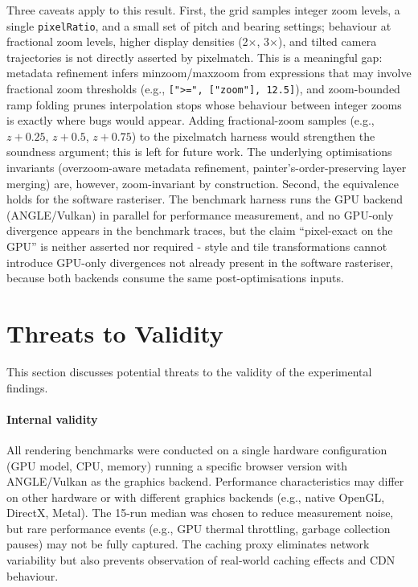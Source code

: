 Three caveats apply to this result.
First, the grid samples integer zoom levels, a single \texttt{pixelRatio}, and a small set of pitch and bearing settings; behaviour at fractional zoom levels, higher display densities (2$\times$, 3$\times$), and tilted camera trajectories is not directly asserted by pixelmatch.
This is a meaningful gap: metadata refinement infers minzoom/maxzoom from expressions that may involve fractional zoom thresholds (e.g., \texttt{[">=",~["zoom"],~12.5]}), and zoom-bounded ramp folding prunes interpolation stops whose behaviour between integer zooms is exactly where bugs would appear.
Adding fractional-zoom samples (e.g., $z + 0.25$, $z + 0.5$, $z + 0.75$) to the pixelmatch harness would strengthen the soundness argument; this is left for future work.
The underlying optimisations invariants (overzoom-aware metadata refinement, painter's-order-pre\-serving layer merging) are, however, zoom-invariant by construction.
Second, the equivalence holds for the software rasteriser.
The benchmark harness runs the GPU backend (ANGLE/Vulkan) in parallel for performance measurement, and no GPU-only divergence appears in the benchmark traces, but the claim \enquote{pixel-exact on the GPU} is neither asserted nor required - style and tile transformations cannot introduce GPU-only divergences not already present in the software rasteriser, because both backends consume the same post-optimisations inputs.


\section{Threats to Validity}\label{sec_threats}

This section discusses potential threats to the validity of the experimental findings.

\paragraph{Internal validity}
All rendering benchmarks were conducted on a single hardware configuration (GPU model, CPU, memory) running a specific browser version with ANGLE/Vulkan as the graphics backend.
Performance characteristics may differ on other hardware or with different graphics backends (e.g., native OpenGL, DirectX, Metal).
The 15-run median was chosen to reduce measurement noise, but rare performance events (e.g., GPU thermal throttling, garbage collection pauses) may not be fully captured.
The caching proxy eliminates network variability but also prevents observation of real-world caching effects and \ac{CDN} behaviour.

